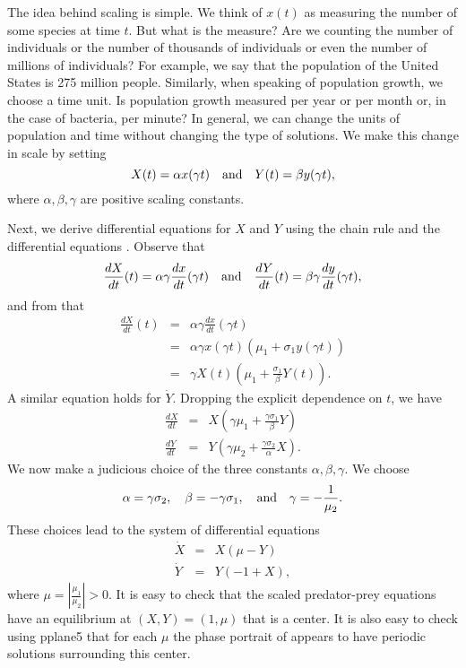 The idea behind scaling is simple.  We think of $x(t)$ as measuring the 
number of some species at time $t$.  But what is the measure?  Are we 
counting the number of individuals or the number of thousands of
individuals or even the number of millions of individuals?  For example, 
we say that the population of the United States is 275 
million people.  Similarly, when speaking of population growth, 
we choose a time unit.  Is population growth measured per year 
or per month or, in the case of bacteria, per minute?  In general, we can 
change the units of population and time without changing the type of 
solutions.  We make this change in scale by setting  
\[
X(t) = \alpha x(\gamma t)  \quad\mbox{and}\quad  Y(t) = \beta y(\gamma t),
\]
where $\alpha,\beta,\gamma$ are positive scaling constants.  

Next, we derive differential equations for $X$ and $Y$ using the
chain rule and the differential 
equations . Observe that 
\[
\frac{dX}{dt}(t) = \alpha \gamma \frac{dx}{dt}(\gamma t) \quad\mbox{and}\quad  
\frac{dY}{dt}(t) = \beta \gamma \frac{dy}{dt}(\gamma t),
\]
and from  that 
\begin{eqnarray*}
\frac{dX}{dt}(t) & = & \alpha \gamma \frac{dx}{dt}(\gamma t) \\
& = & \alpha \gamma x(\gamma t)(\mu_1 + \sigma_1y(\gamma t)) \\
& = & \gamma X(t)(\mu_1 + \frac{\sigma_1}{\beta}Y(t)).
\end{eqnarray*}
A similar equation holds for $\dot{Y}$.  Dropping the explicit 
dependence on $t$, we have
\begin{eqnarray*}
\frac{dX}{dt} & = & X(\gamma \mu_1 + \frac{\gamma\sigma_1}{\beta}Y)\\
\frac{dY}{dt} & = & Y(\gamma \mu_2 + \frac{\gamma\sigma_2}{\alpha}X).
\end{eqnarray*}
We now make a judicious choice of the three constants $\alpha,\beta,
\gamma$.  We choose
\begin{equation}  \label{E:scalingcoeff}
\alpha = \gamma\sigma_2, \quad \beta = -\gamma\sigma_1, \quad\mbox{and}\quad
\gamma = -\frac{1}{\mu_2}.
\end{equation}
These choices lead to the system of differential equations
\begin{equation*}  \label{e:PP2}
\begin{array}{lcl}
\dot{X} & = & X(\mu - Y) \\
\dot{Y} & = & Y(-1 + X),
\end{array}
\end{equation*}%
where $\mu = \left|\frac{\mu_1}{\mu_2}\right|>0$.  It is easy to 
check that the scaled predator-prey equations  have 
an equilibrium at $(X,Y)=(1,\mu)$ that is a center.  It is also 
easy to check using {\sf pplane5} that for each $\mu$ the phase 
portrait of  appears to have periodic solutions 
surrounding this center.

